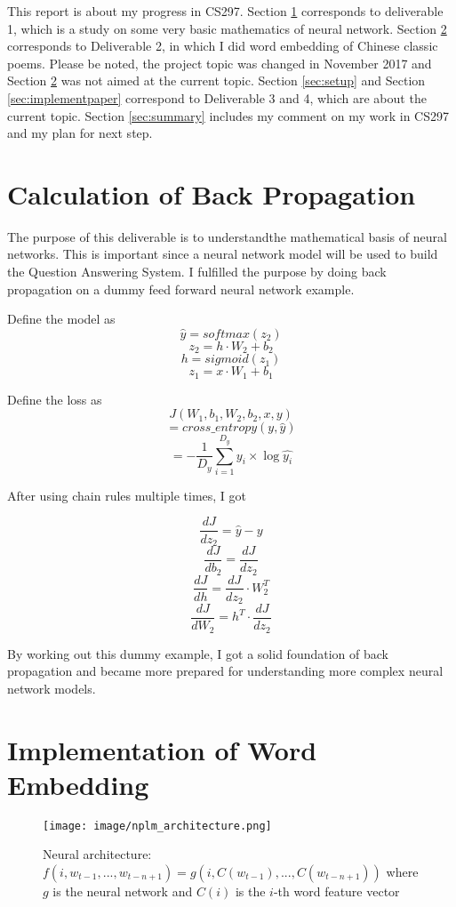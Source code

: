 \documentclass[12pt]{article}
\begin{document}
This report is about my progress in CS297. Section \ref{sec:calculation}  corresponds to deliverable 1, which is a study on some very basic mathematics of neural network. Section \ref{sec:embdding} corresponds to Deliverable 2, in which I did word embedding of Chinese classic poems. Please be noted, the project topic was changed in November 2017 and Section \ref{sec:embdding} was not aimed at the current topic. Section \ref{sec:setup} and Section \ref{sec:implementpaper} correspond to Deliverable 3 and 4, which are about the current topic. Section \ref{sec:summary} includes my comment on my work in CS297 and my plan for next step.

\break

\section{Calculation of Back Propagation}\label{sec:calculation}

The purpose of this deliverable is to understandthe mathematical basis of neural networks. This is important since a neural network model will be used to build the Question Answering System. I fulfilled the purpose by doing back propagation on a dummy feed forward neural network example.


Define the model as
$$\hat{y}=softmax(z_2)$$
$$z_2=h\cdot W_2 + b_2$$
$$h=sigmoid(z_1)$$
$$z_1=x\cdot W_1+b_1$$

Define the loss as
$$J(W_1, b_1, W_2, b_2, x, y)$$
$$=cross\_entropy(y, \hat{y})$$
$$=-\frac{1}{D_y}\sum_{i=1}^{D_y}y_i \times \log{\hat{y_i}} $$

After using chain rules multiple times, I got

$$\frac{dJ}{dz_2}=\hat{y} - y$$
$$\frac{dJ}{db_2}=\frac{dJ}{dz_2}$$
$$\frac{dJ}{dh}=\frac{dJ}{dz_2}\cdot W_2^T$$
$$\frac{dJ}{dW_2}=h^T \cdot \frac{dJ}{dz_2}$$

By working out this dummy example, I got a solid foundation of back propagation and became more prepared for understanding more complex neural network models.

\break

\section{Implementation of Word Embedding}\label{sec:embdding}

\begin{figure}[h]
\texttt{[image: image/nplm\_architecture.png]}
\centering
\caption{Neural architecture: $f(i,w_{t-1},... ,w_{t-n+1}) =g(i,C(w_{t-1}),... ,C(w_{t-n+1}))$ where $g$ is the neural network and $C(i)$ is the $i$-th word feature vector\cite{bengio2003neural}}
\label{fig:nplm}
\end{figure}
\end{document}
